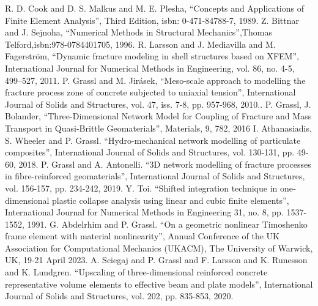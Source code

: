 \documentclass[a4paper]{article}
\begin{document}
\begin{thebibliography}{99}
 R. D. Cook and D. S. Malkus and M. E. Plesha, ``Concepts and Applications of Finite Element Analysis'', Third Edition, isbn: 0-471-84788-7, 1989.
 Z. Bittnar and J. Sejnoha, ``Numerical Methods in Structural Mechanics'',Thomas Telford,isbn:978-0784401705, 1996.
 R. Larsson and J. Mediavilla and M. Fagerström, ``Dynamic fracture modeling in shell structures based on XFEM'', International Journal for Numerical Methods in Engineering, vol. 86, no. 4-5, 499--527, 2011.
 P. Grassl and M. Jir\'{a}sek, ``Meso-scale approach to modelling the fracture process zone of concrete subjected to uniaxial tension'', International Journal of Solids and Structures, vol. 47, iss. 7-8, pp. 957-968, 2010..
 P. Grassl, J. Bolander, ``Three-Dimensional Network Model for Coupling of Fracture and Mass Transport in Quasi-Brittle Geomaterials'', Materials, 9, 782, 2016
 I. Athanasiadis, S. Wheeler and P. Grassl. ``Hydro-mechanical network modelling of particulate composites'', International Journal of Solids and Structures, vol. 130-131, pp. 49-60, 2018.
 P. Grassl and A. Antonelli. ``3D network modelling of fracture processes in fibre-reinforced geomaterials'', International Journal of Solids and Structures, vol. 156-157, pp. 234-242, 2019.
 Y. Toi. ``Shifted integration technique in one‐dimensional plastic collapse analysis using linear and cubic finite elements'', International Journal for Numerical Methods in Engineering 31, no. 8, pp. 1537-1552, 1991.
 G. Abdelrhim and P. Grassl. ``On a geometric nonlinear Timoshenko frame element with material nonlinearity'', Annual Conference of the UK Association for Computational Mechanics (UKACM), The University of Warwick, UK, 19-21 April 2023.
 A. Sciegaj and P. Grassl and F. Larsson and K. Runesson and K. Lundgren. ``Upscaling of three-dimensional reinforced concrete representative volume elements to effective beam and plate models'', International Journal of Solids and Structures, vol. 202, pp. 835-853, 2020.
\end{thebibliography}
\end{document}
